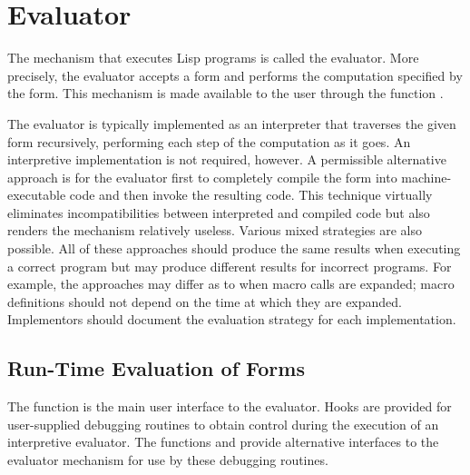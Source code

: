 
\clearpage\def\pagestatus{FINAL PROOF}

\ifx \rulang\Undef

\chapter{Evaluator}

The mechanism that executes Lisp programs is called the evaluator.
More precisely, the evaluator accepts a form and performs the
computation specified by the form.  This mechanism is made available
to the user through the function .

The evaluator is typically implemented as an interpreter
that traverses the given form recursively, performing each step
of the computation as it goes.  An interpretive implementation is not
required, however.  A permissible alternative approach is
for the evaluator first to completely compile the form into
machine-executable code and then invoke the resulting code.
This technique virtually eliminates incompatibilities
between interpreted and compiled code but also renders the 
mechanism relatively useless.
Various mixed strategies are also possible.  All of these approaches
should produce the same results when executing a correct program
but may produce different results for incorrect programs.
For example, the approaches may differ as to when macro calls
are expanded; macro definitions should not depend on the time
at which they are expanded.  Implementors should
document the evaluation strategy for each implementation.

\section{Run-Time Evaluation of Forms}

The function  is the main user interface to the evaluator.
Hooks are provided for user-supplied debugging routines
to obtain control during the execution of an interpretive evaluator.
The functions  and  provide alternative
interfaces to the evaluator mechanism for use by these debugging routines.

